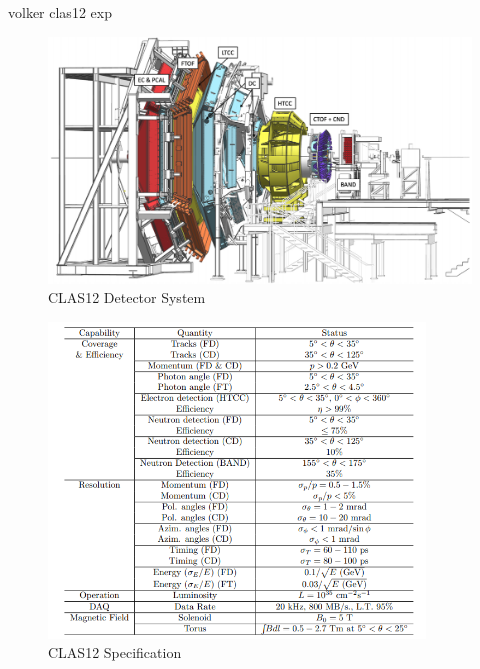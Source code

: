 
    volker clas12 exp \cite{Burkert2020TheLaboratory}



    \begin{figure}[H]
        \centering
        \includegraphics[width=12cm]{Chapters/Ch2-Experiment/clas-12-exp/clas-detectors/other/pics/CLAS12.png}
        \caption{ CLAS12 Detector System }
    \end{figure}
    
    \begin{figure}[H]
        \centering
        \includegraphics[width=10cm]{Chapters/Ch2-Experiment/clas-12-exp/clas-detectors/other/pics/clas12-params.png}
        \caption{CLAS12 Specification}
    \end{figure}

